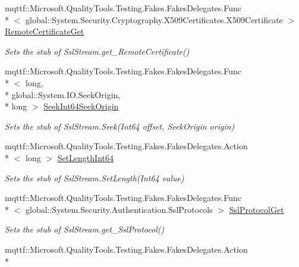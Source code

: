 \begin{DoxyCompactItemize}
mqttf\-::\-Microsoft.\-Quality\-Tools.\-Testing.\-Fakes.\-Fakes\-Delegates.\-Func\\*
$<$ global\-::\-System.\-Security.\-Cryptography.\-X509\-Certificates.\-X509\-Certificate $>$ \hyperlink{class_system_1_1_net_1_1_security_1_1_fakes_1_1_stub_ssl_stream_a7b08151be5f23f73b14260d954f58f2c}{Remote\-Certificate\-Get}
\begin{DoxyCompactList}\small\item\em Sets the stub of Ssl\-Stream.\-get\-\_\-\-Remote\-Certificate()\end{DoxyCompactList}\item 
mqttf\-::\-Microsoft.\-Quality\-Tools.\-Testing.\-Fakes.\-Fakes\-Delegates.\-Func\\*
$<$ long, \\*
global\-::\-System.\-I\-O.\-Seek\-Origin, \\*
long $>$ \hyperlink{class_system_1_1_net_1_1_security_1_1_fakes_1_1_stub_ssl_stream_a060579846343665b6c4a4e7e6c3a91ec}{Seek\-Int64\-Seek\-Origin}
\begin{DoxyCompactList}\small\item\em Sets the stub of Ssl\-Stream.\-Seek(\-Int64 offset, Seek\-Origin origin)\end{DoxyCompactList}\item 
mqttf\-::\-Microsoft.\-Quality\-Tools.\-Testing.\-Fakes.\-Fakes\-Delegates.\-Action\\*
$<$ long $>$ \hyperlink{class_system_1_1_net_1_1_security_1_1_fakes_1_1_stub_ssl_stream_a956ab2130ac757633ae4cfb8087d0853}{Set\-Length\-Int64}
\begin{DoxyCompactList}\small\item\em Sets the stub of Ssl\-Stream.\-Set\-Length(\-Int64 value)\end{DoxyCompactList}\item 
mqttf\-::\-Microsoft.\-Quality\-Tools.\-Testing.\-Fakes.\-Fakes\-Delegates.\-Func\\*
$<$ global\-::\-System.\-Security.\-Authentication.\-Ssl\-Protocols $>$ \hyperlink{class_system_1_1_net_1_1_security_1_1_fakes_1_1_stub_ssl_stream_a5c4489a8e393f1e8422140eba10b381e}{Ssl\-Protocol\-Get}
\begin{DoxyCompactList}\small\item\em Sets the stub of Ssl\-Stream.\-get\-\_\-\-Ssl\-Protocol()\end{DoxyCompactList}\item 
mqttf\-::\-Microsoft.\-Quality\-Tools.\-Testing.\-Fakes.\-Fakes\-Delegates.\-Action\\*

\end{DoxyCompactItemize}
